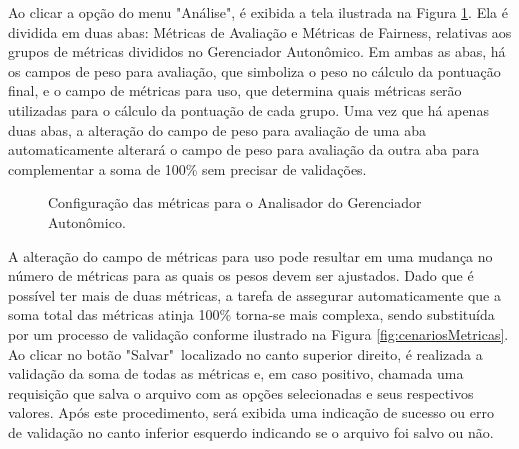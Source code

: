 \documentclass[portugues]{ic-tese}
\begin{document}
Ao clicar a opção do menu "Análise", é exibida a tela ilustrada na Figura \ref{fig:configMetricas}. Ela é dividida em duas abas: Métricas de Avaliação e Métricas de Fairness, relativas aos grupos de métricas divididos no Gerenciador Autonômico. Em ambas as abas, há os campos de peso para avaliação, que simboliza o peso no cálculo da pontuação final, e o campo de métricas para uso, que determina quais métricas serão utilizadas para o cálculo da pontuação de cada grupo. Uma vez que há apenas duas abas, a alteração do campo de peso para avaliação de uma aba automaticamente alterará o campo de peso para avaliação da outra aba para complementar a soma de 100\% sem precisar de validações.

\begin{figure}[H]
    \centering
    \caption{Configuração das métricas para o Analisador do Gerenciador Autonômico.}
    \label{fig:configMetricas}
\end{figure}

A alteração do campo de métricas para uso pode resultar em uma mudança no número de métricas para as quais os pesos devem ser ajustados. Dado que é possível ter mais de duas métricas, a tarefa de assegurar automaticamente que a soma total das métricas atinja 100\% torna-se mais complexa, sendo substituída por um processo de validação conforme ilustrado na Figura \ref{fig:cenariosMetricas}. Ao clicar no botão "Salvar"~localizado no canto superior direito, é realizada a validação da soma de todas as métricas e, em caso positivo, chamada uma requisição que salva o arquivo com as opções selecionadas e seus respectivos valores. Após este procedimento, será exibida uma indicação de sucesso ou erro de validação no canto inferior esquerdo indicando se o arquivo foi salvo ou não.
\end{document}
